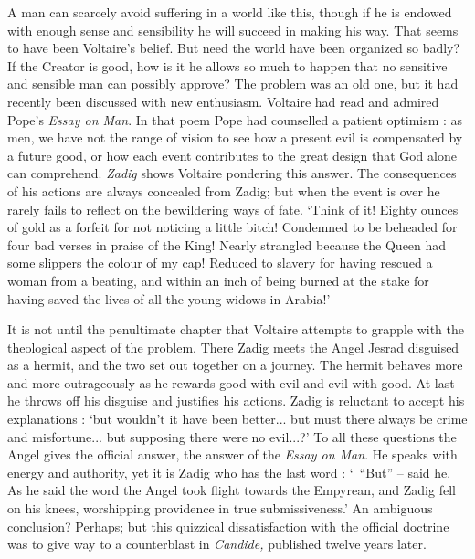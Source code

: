 \documentclass{article}
\begin{document}
\begin{center}
A man can scarcely avoid suffering in a world like this, though if he is endowed 
with enough sense and sensibility he will succeed in making his way. That seems 
to have been Voltaire's belief. But need the world have been organized so badly? 
If the Creator is good, how is it he allows so much to happen that no sensitive 
and sensible man can possibly approve? The problem was an old one, but it had recently 
been discussed with new enthusiasm. Voltaire had read and admired Pope's \textit{Essay 
on Man}. In that poem Pope had counselled a patient optimism : as men, we have 
not the range of vision to see how a present evil is compensated by a future good, 
or how each event contributes to the great design that God alone can comprehend. 
\textit{Zadig} shows Voltaire pondering this answer. The consequences of his actions 
are always concealed from Zadig; but when the event is over he rarely fails to 
reflect on the bewildering ways of fate. `Think of it! Eighty ounces of gold as 
a forfeit for not noticing a little bitch! Condemned to be beheaded for four bad 
verses in praise of the King! Nearly strangled because the Queen had some slippers 
the colour of my cap! Reduced to slavery for having rescued a woman from a beating, 
and within an inch of being burned at the stake for having saved the lives of all 
the young widows in Arabia!' 

It is not until the penultimate chapter that Voltaire attempts to grapple with 
the theological aspect of the problem. There Zadig meets the Angel Jesrad disguised 
as a hermit, and the two set out together on a journey. The hermit behaves more 
and more outrageously as he rewards good with evil and evil with good. At last 
he throws off his disguise and justifies his actions. Zadig is reluctant to accept 
his explanations : `but wouldn't it have been better... but must there always be 
crime and misfortune... but supposing there were no evil...?' To all these questions 
the Angel gives the official answer, the answer of the \textit{Essay on Man}. He 
speaks with energy and authority, yet it is Zadig who has the last word : `~``But'' 
– said he. As he said the word the Angel took flight towards the Empyrean, and 
Zadig fell on his knees, worshipping providence in true submissiveness.' An ambiguous 
conclusion? Perhaps; but this quizzical dissatisfaction with the official doctrine 
was to give way to a counterblast in \textit{Candide,} published twelve years later. 


\end{center}
\end{document}
